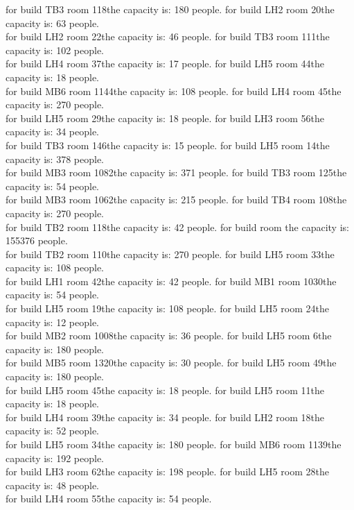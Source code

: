 for build TB3 room 118the capacity is: 180 people.
for build LH2 room 20the capacity is: 63 people.\\
for build LH2 room 22the capacity is: 46 people.
for build TB3 room 111the capacity is: 102 people.\\
for build LH4 room 37the capacity is: 17 people.
for build LH5 room 44the capacity is: 18 people.\\
for build MB6 room 1144the capacity is: 108 people.
for build LH4 room 45the capacity is: 270 people.\\
for build LH5 room 29the capacity is: 18 people.
for build LH3 room 56the capacity is: 34 people.\\
for build TB3 room 146the capacity is: 15 people.
for build LH5 room 14the capacity is: 378 people.\\
for build MB3 room 1082the capacity is: 371 people.
for build TB3 room 125the capacity is: 54 people.\\
for build MB3 room 1062the capacity is: 215 people.
for build TB4 room 108the capacity is: 270 people.\\
for build TB2 room 118the capacity is: 42 people.
for build  room the capacity is: 155376 people.\\
for build TB2 room 110the capacity is: 270 people.
for build LH5 room 33the capacity is: 108 people.\\
for build LH1 room 42the capacity is: 42 people.
for build MB1 room 1030the capacity is: 54 people.\\
for build LH5 room 19the capacity is: 108 people.
for build LH5 room 24the capacity is: 12 people.\\
for build MB2 room 1008the capacity is: 36 people.
for build LH5 room 6the capacity is: 180 people.\\
for build MB5 room 1320the capacity is: 30 people.
for build LH5 room 49the capacity is: 180 people.\\
for build LH5 room 45the capacity is: 18 people.
for build LH5 room 11the capacity is: 18 people.\\
for build LH4 room 39the capacity is: 34 people.
for build LH2 room 18the capacity is: 52 people.\\
for build LH5 room 34the capacity is: 180 people.
for build MB6 room 1139the capacity is: 192 people.\\
for build LH3 room 62the capacity is: 198 people.
for build LH5 room 28the capacity is: 48 people.\\
for build LH4 room 55the capacity is: 54 people.
